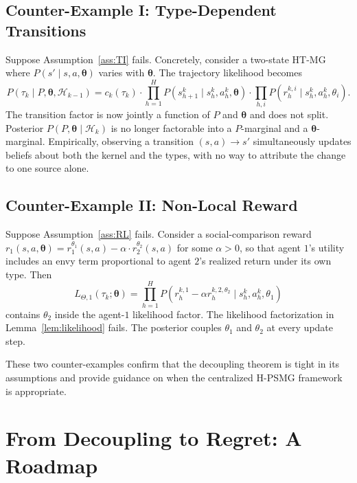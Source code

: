\subsection{Counter-Example I: Type-Dependent Transitions}

Suppose Assumption~\ref{ass:TI} fails. Concretely, consider a two-state HT-MG where $P(s' \mid s, a, \boldsymbol{\theta})$ varies with $\boldsymbol{\theta}$. The trajectory likelihood becomes
\begin{equation}
P(\tau_k \mid P, \boldsymbol{\theta}, \mathcal{H}_{k-1}) = c_k(\tau_k) \cdot \prod_{h=1}^H P(s_{h+1}^k \mid s_h^k, a_h^k, \boldsymbol{\theta}) \cdot \prod_{h, i} P(r_h^{k,i} \mid s_h^k, a_h^k, \theta_i).
\end{equation}
The transition factor is now jointly a function of $P$ and $\boldsymbol{\theta}$ and does not split. Posterior $P(P, \boldsymbol{\theta} \mid \mathcal{H}_k)$ is no longer factorable into a $P$-marginal and a $\boldsymbol{\theta}$-marginal. Empirically, observing a transition $(s, a) \to s'$ simultaneously updates beliefs about both the kernel and the types, with no way to attribute the change to one source alone.

\subsection{Counter-Example II: Non-Local Reward}

Suppose Assumption~\ref{ass:RL} fails. Consider a social-comparison reward $r_1(s, a, \boldsymbol{\theta}) = r_1^{\theta_1}(s, a) - \alpha \cdot r_2^{\theta_2}(s, a)$ for some $\alpha > 0$, so that agent $1$'s utility includes an envy term proportional to agent $2$'s realized return under its own type. Then
\begin{equation}
L_{\Theta,1}(\tau_k; \boldsymbol{\theta}) = \prod_{h=1}^H P\left(r_h^{k,1} - \alpha r_h^{k,2,\theta_2} \mid s_h^k, a_h^k, \theta_1\right)
\end{equation}
contains $\theta_2$ inside the agent-$1$ likelihood factor. The likelihood factorization in Lemma~\ref{lem:likelihood} fails. The posterior couples $\theta_1$ and $\theta_2$ at every update step.

These two counter-examples confirm that the decoupling theorem is tight in its assumptions and provide guidance on when the centralized H-PSMG framework is appropriate.

\section{From Decoupling to Regret: A Roadmap}
\label{sec:regret-roadmap}

